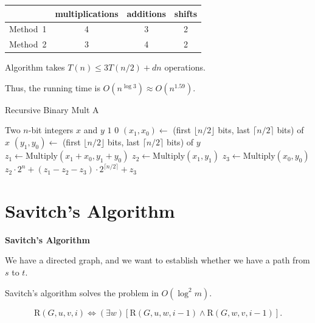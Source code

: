 \begin{frame}
\begin{center}
\begin{tabular}{l|ccc}
                           & multiplications & additions & shifts \\\hline
Method~1 & 4               & 3         & 2      \\
Method~2 & 3               & 4         & 2
\end{tabular}
\end{center}

Algorithm takes $T(n)\le 3T(n/2)+dn$
operations.  

Thus, the running time is $O(n^{\log 3})\approx
O(n^{1.59})$.
\end{frame}

\begin{frame}
{Recursive Binary Mult A\fi}

\begin{algorithmic}[1]
\REQUIRE Two $n$-bit integers $x$ and $y$
		\RETURN $1$
	\ELSE
		\RETURN $0$
	\ENDIF
\ENDIF
\STATE $(x_1,x_0)\longleftarrow$ (first $\lfloor n/2\rfloor$ bits,
																 last $\lceil n/2\rceil$ bits) of $x$
\STATE $(y_1,y_0)\longleftarrow$ (first $\lfloor n/2\rfloor$ bits,
																 last $\lceil n/2\rceil$ bits) of $y$
\STATE $z_1\longleftarrow \mathrm{Multiply}(x_1+x_0,y_1+y_0)$
\STATE $z_2\longleftarrow \mathrm{Multiply}(x_1,y_1)$
\STATE $z_3\longleftarrow \mathrm{Multiply}(x_0,y_0)$
\RETURN $z_2\cdot 2^n+(z_1-z_2-z_3)\cdot 2^{\lceil n/2\rceil}+z_3$
\end{algorithmic}

\end{frame}

\section{Savitch's Algorithm}

\begin{frame}
{\bf Savitch's Algorithm}

We have a directed graph, and we want to establish whether we have a
path from $s$ to $t$.

Savitch's algorithm solves the problem in  $O(\log^2m)$.

\begin{equation}\label{eq:savitch}
\text{R}(G,u,v,i)\iff
(\exists w)[\text{R}(G,u,w,i-1)\wedge\text{R}(G,w,v,i-1)].
\end{equation}
\end{frame}

